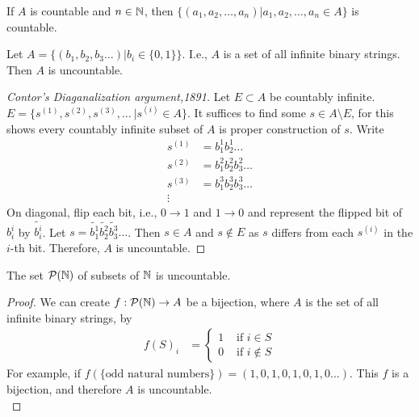 \begin{corollary}
	If $A$ is countable and $n \in \mathbb{N} $, then $\{(a_1,a_2, \ldots ,a_n)| a_1,a_2, \ldots , a_n \in A  \} $ is countable.
\end{corollary}


\begin{theorem}
	Let $A= \{(b_1,b_2,b_3 \ldots )| b_i \in \{0,1\} \}$. I.e., $A$ is a set of all infinite binary strings.
	Then $A$ is uncountable.
	\begin{proof}[Contor's Diaganalization argument,1891]
		Let $E \subset A$ be countably infinite. $E=\{s^{(1)},s^{(2)},s^{(3)}, \ldots\ | s^{(i)} \in A\} $.
		It suffices to find some $s \in A \setminus E$, for this shows every countably infinite subset of $A$ is proper construction of $s$.
		Write
		\begin{align}
			s^{(1)} & = b_1^{1}b_2^{1} \ldots       \\
			s^{(2)} & =b^{2}_1b^{2}_2b^{2}_3 \ldots \\
			s^{(3)} & =b^{3}_1b^{3}_2b^{3}_3 \ldots \\
			\vdots  & \nonumber
		\end{align}
		On diagonal, flip each bit, i.e., $0\to 1$ and $1\to 0$ and represent the flipped bit of $b_i^{i}$ by $\tilde{b_i^{i}}$.
		Let $s=\tilde{b_1^{1}}\tilde{b_2^{2}}\tilde{b_3^{3}}\ldots$.
		Then $s \in A$ and $s \notin E$ as $s$ differs from each $s^{(i)}$ in the $i$-th bit. Therefore, $A$ is uncountable.
	\end{proof}
\end{theorem}

\begin{corollary}
	The set $\mathcal{P}(\mathbb{N})$ of subsets of $\mathbb{N} $ is uncountable.
	\begin{proof}
		We can create $f: \mathcal{P}(\mathbb{N}) \to A$ be a bijection, where $A$ is the set of all infinite binary strings, by
		\begin{align}
			f(S)_i & = \begin{cases}
				           1 & \text{ if $i \in S$}    \\
				           0 & \text{ if $i \notin S$}
			           \end{cases}
		\end{align}
		For example, if $f(\{\text{odd natural numbers}\})= (1,0,1,0,1,0,1,0\ldots)$.
		This $f$ is a bijection, and therefore $A$ is uncountable.\\
	\end{proof}
\end{corollary}

